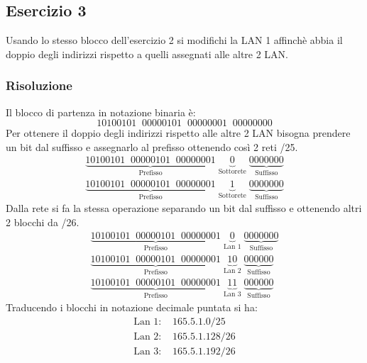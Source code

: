 \documentclass[a4paper]{article}
\begin{document}
\subsection{Esercizio 3}
Usando lo stesso blocco dell'esercizio 2 si modifichi la LAN 1 affinchè abbia il doppio
degli indirizzi rispetto a quelli assegnati alle altre 2 LAN.

\subsubsection{Risoluzione}
Il blocco di partenza in notazione binaria è:
\[
  10100101 \;\; 00000101 \;\; 00000001 \;\; 00000000
\] 
Per ottenere il doppio degli indirizzi rispetto alle altre 2 LAN bisogna prendere un bit
dal suffisso e assegnarlo al prefisso ottenendo così 2 reti /25.
\[
  \begin{aligned}
    \underbrace{1010 0101 \;\; 0000 0101 \;\; 0000 0001}_{\text{Prefisso}} \;
    \underbrace{0}_{\text{Sottorete}} \;
    \underbrace{000 0000}_{\text{Suffisso}}\\
    \underbrace{1010 0101 \;\; 0000 0101 \;\; 0000 0001}_{\text{Prefisso}} \;
    \underbrace{1}_{\text{Sottorete}} \;
    \underbrace{000 0000}_{\text{Suffisso}}
  \end{aligned}
\]
Dalla rete si fa la stessa operazione separando un bit dal suffisso e ottenendo altri 
2 blocchi da /26.
\[
\begin{aligned}
    \underbrace{1010 0101 \;\; 0000 0101 \;\; 0000 0001}_{\text{Prefisso}} \;
    \underbrace{0}_{\text{Lan 1}} \;
    \underbrace{000 0000}_{\text{Suffisso}}\\
    \underbrace{1010 0101 \;\; 0000 0101 \;\; 0000 0001}_{\text{Prefisso}} \;
    \underbrace{10}_{\text{Lan 2}} \;
    \underbrace{00 0000}_{\text{Suffisso}}\\
    \underbrace{1010 0101 \;\; 0000 0101 \;\; 0000 0001}_{\text{Prefisso}} \;
    \underbrace{11}_{\text{Lan 3}} \;
    \underbrace{00 0000}_{\text{Suffisso}}
\end{aligned}
\] 
Traducendo i blocchi in notazione decimale puntata si ha:
\[
  \begin{aligned}
    \text{Lan 1: } & 165.5.1.0/25\\
    \text{Lan 2: } & 165.5.1.128/26\\
    \text{Lan 3: } & 165.5.1.192/26
  \end{aligned}
\] 
\end{document}
